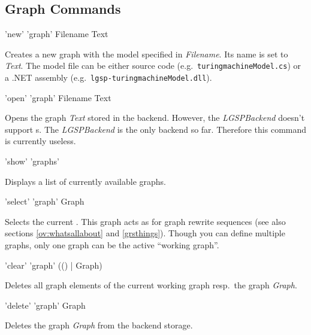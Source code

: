 \subsection{Graph Commands}
\label{graphcommands}

\begin{rail}
  'new' 'graph' Filename Text 
\end{rail}
Creates a new graph with the model specified in \emph{Filename}. Its name is set to \emph{Text}. The model file can be either source code (e.g.\ \texttt{turing\textunderscore machineModel.cs}) or a .NET assembly (e.g.\ \texttt{lgsp-turing\textunderscore machineModel.dll}).

\begin{rail}
  'open' 'graph' Filename Text
\end{rail}
Opens the graph \emph{Text} stored in the backend. However, the \emph{LGSPBackend} doesn't support s. The \emph{LGSPBackend} is the only backend so far. Therefore this command is currently useless.

\begin{rail}
  'show' 'graphs'
\end{rail}
Displays a list of currently available graphs.

\begin{rail}
  'select' 'graph' Graph
\end{rail}
Selects the current . This graph acts as \emph{} for graph rewrite sequences (see also sections \ref{ov:whatsallabout} and \ref{grsthings}). Though you can define multiple graphs, only one graph can be the active ``working graph''.

\begin{rail}
  'clear' 'graph' (() | Graph)
\end{rail}
Deletes all graph elements of the current working graph resp.\ the graph \emph{Graph}.

\begin{rail}
  'delete' 'graph' Graph
\end{rail}
Deletes the graph \emph{Graph} from the backend storage.

